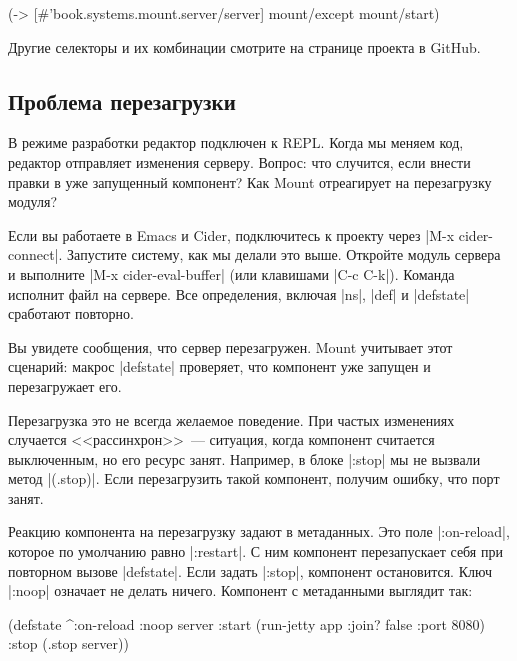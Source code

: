 \begin{english}
  \begin{clojure}
(-> [#'book.systems.mount.server/server]
    mount/except
    mount/start)
  \end{clojure}
\end{english}

Другие селекторы и их комбинации смотрите на странице проекта в GitHub.

\subsection{Проблема перезагрузки}

В режиме разработки редактор подключен к REPL. Когда мы меняем код, редактор
отправляет изменения серверу. Вопрос: что случится, если внести правки в уже
запущенный компонент? Как Mount отреагирует на перезагрузку модуля?

Если вы работаете в Emacs и Cider, подключитесь к проекту через \spverb|M-x
cider-connect|. Запустите систему, как мы делали это выше. Откройте модуль
сервера и выполните \spverb|M-x cider-eval-buffer| (или клавишами \spverb|C-c
C-k|). Команда исполнит файл на сервере. Все определения, включая \spverb|ns|,
\spverb|def| и \spverb|defstate| сработают повторно.

Вы увидете сообщения, что сервер перезагружен. Mount учитывает этот сценарий:
макрос \spverb|defstate| проверяет, что компонент уже запущен и перезагружает
его.

Перезагрузка это не всегда желаемое поведение. При частых изменениях случается
<<рассинхрон>>~--- ситуация, когда компонент считается выключенным, но его
ресурс занят. Например, в блоке \spverb|:stop| мы не вызвали метод
\spverb|(.stop)|. Если перезагрузить такой компонент, получим ошибку, что порт
занят.

Реакцию компонента на перезагрузку задают в метаданных. Это поле
\spverb|:on-reload|, которое по умолчанию равно \spverb|:restart|. С ним
компонент перезапускает себя при повторном вызове \spverb|defstate|. Если задать
\spverb|:stop|, компонент остановится. Ключ \spverb|:noop| означает не делать
ничего. Компонент с метаданными выглядит так:

\begin{english}
  \begin{clojure}
(defstate ^{:on-reload :noop} server
  :start (run-jetty app {:join? false :port 8080})
  :stop (.stop server))
  \end{clojure}
\end{english}

